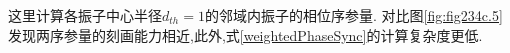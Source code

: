 \documentclass{article}
\begin{document}
\vspace{-0.5cm}
这里计算各振子中心半径$d_{th}=1$的邻域内振子的相位序参量.
对比图\ref{fig:fig234c.5}发现两序参量的刻画能力相近,此外,式\ref{weightedPhaseSync}的计算复杂度更低.



		





		
\end{document}
